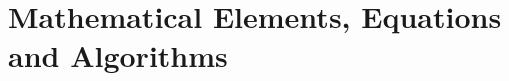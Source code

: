 \chapter[Mathematical Elements]{Mathematical Elements, Equations and Algorithms}
\label{chap:Mathematics}

